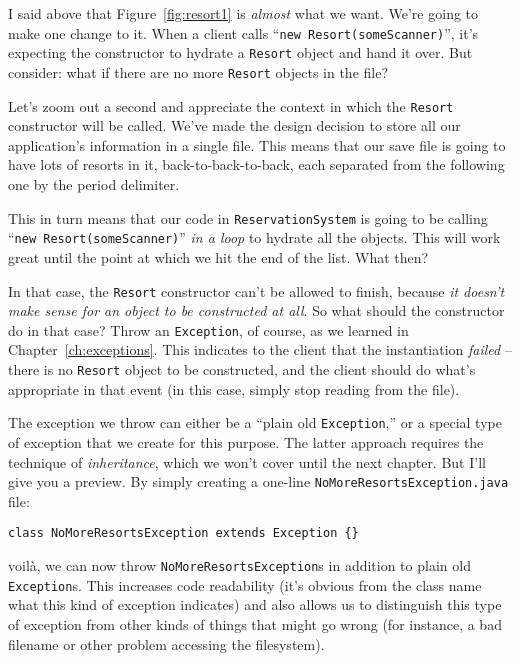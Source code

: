 I said above that Figure~\ref{fig:resort1} is \textit{almost} what we want.
We're going to make one change to it. When a client calls ``\texttt{new
Resort(someScanner)}'', it's expecting the constructor to hydrate a
\texttt{Resort} object and hand it over. But consider: what if there are no
more \texttt{Resort} objects in the file?

Let's zoom out a second and appreciate the context in which the
\texttt{Resort} constructor will be called. We've made the design decision to
store all our application's information in a single file. This means that our
save file is going to have lots of resorts in it, back-to-back-to-back, each
separated from the following one by the period delimiter.

This in turn means that our code in \texttt{ReservationSystem} is going to be
calling ``\texttt{new Resort(someScanner)}'' \textit{in a loop} to hydrate all
the objects. This will work great until the point at which we hit the end of
the list. What then?

In that case, the \texttt{Resort} constructor can't be allowed to finish,
because \textit{it doesn't make sense for an object to be constructed at all}.
So what should the constructor do in that case? Throw an \texttt{Exception},
of course, as we learned in Chapter~\ref{ch:exceptions}. This indicates to the
client that the instantiation \textit{failed} -- there is no \texttt{Resort}
object to be constructed, and the client should do what's appropriate in that
event (in this case, simply stop reading from the file).

The exception we throw can either be a ``plain old \texttt{Exception},'' or a
special type of exception that we create for this purpose. The latter approach
requires the technique of \textit{inheritance}, which we won't cover until the
next chapter. But I'll give you a preview. By simply creating a one-line
\texttt{NoMoreResortsException.java} file:

\begin{Verbatim}[fontsize=\small,samepage=true,frame=single]
class NoMoreResortsException extends Exception {}
\end{Verbatim}

voil\`{a}, we can now throw \texttt{NoMoreResortsException}s in addition to
plain old \texttt{Exception}s. This increases code readability (it's obvious
from the class name what this kind of exception indicates) and also allows us
to distinguish this type of exception from other kinds of things that might go
wrong (for instance, a bad filename or other problem accessing the
filesystem).

